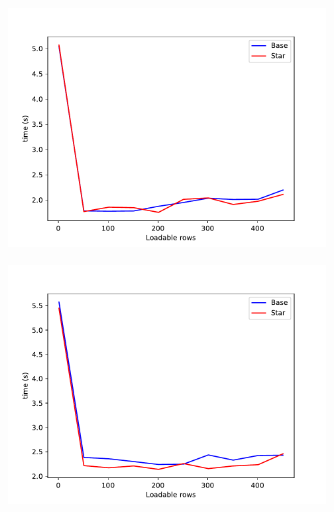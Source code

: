 \documentclass{beamer}
\begin{document}
\begin{frame}
    \begin{figure}
        \centering
        \includegraphics[width=0.75\textwidth]{loadable_rows_time_diff.pdf}
        \label{fig:loadable_rows_time_diff}
    \end{figure}
\end{frame}

\begin{frame}
    \begin{figure}
        \centering
        \includegraphics[width=0.75\textwidth]{loadable_rows_time_diff_rev.pdf}
        \label{fig:loadable_rows_time_diff_rev}
    \end{figure}
\end{frame}
\end{document}
